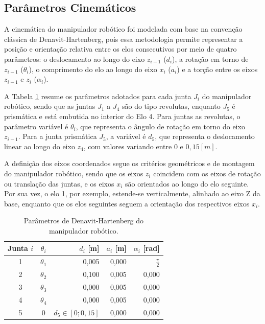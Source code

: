 \subsection{Parâmetros Cinemáticos}

A cinemática do manipulador robótico foi modelada com base na convenção clássica de Denavit-Hartenberg, pois essa metodologia permite representar a posição e orientação relativa entre os elos consecutivos por meio de quatro parâmetros:
o deslocamento ao longo do eixo $z_{i-1}$ ($d_i$),
a rotação em torno de $z_{i-1}$ ($\theta_i$),
o comprimento do elo ao longo do eixo $x_i$ ($a_i$) e
a torção entre os eixos $z_{i-1}$ e $z_i$ ($\alpha_i$).

A Tabela \ref{tab:DH_parametros} resume os parâmetros adotados para cada junta $J_i$ do manipulador robótico, sendo que as juntas $J_1$ a $J_4$ são do tipo revolutas, enquanto $J_5$ é prismática e está embutida no interior do Elo 4. Para juntas as revolutas, o parâmetro variável é $\theta_i$, que representa o ângulo de rotação em torno do eixo $z_{i-1}$. Para a junta prismática $J_5$, a variável é $d_5$, que representa o deslocamento linear ao longo do eixo $z_4$, com valores variando entre $0$ e $0{,}15[m]$.

A definição dos eixos coordenados segue os critérios geométricos e de montagem do manipulador robótico, sendo que os eixos $z_i$ coincidem com os eixos de rotação ou translação das juntas, e os eixos $x_i$ são orientados ao longo do elo seguinte.
Por sua vez, o elo 1, por exemplo, estende-se verticalmente, alinhado ao eixo Z da base, enquanto que os elos seguintes seguem a orientação dos respectivos eixos $x_i$.

\setlength{\tabcolsep}{20pt} 
\renewcommand{\arraystretch}{1}
\begin{table}[ht]
\centering
\caption{Parâmetros de Denavit-Hartenberg do manipulador robótico.}
\label{tab:DH_parametros}
\begin{tabular}{ccrrr}
\toprule
Junta $i$ & $\theta_i$ & $d_i$ [m] & $a_i$ [m] & $\alpha_i$ [rad] \\
\midrule
1 & $\theta_1$ & 0{,}005        & 0{,}000  & $\frac{\pi}{2}$ \\ [4pt]
2 & $\theta_2$ & 0{,}100        & 0{,}005  & 0{,}000         \\ [4pt]
3 & $\theta_3$ & 0{,}000        & 0{,}005  & 0{,}000         \\ [4pt]
4 & $\theta_4$ & 0{,}000        & 0{,}005  & 0{,}000         \\ [4pt]
5 & 0          & $d_5 \in [0; 0,15]$ & 0{,}000  & 0{,}000       \\ [4pt]
\bottomrule
\end{tabular}
\end{table}
